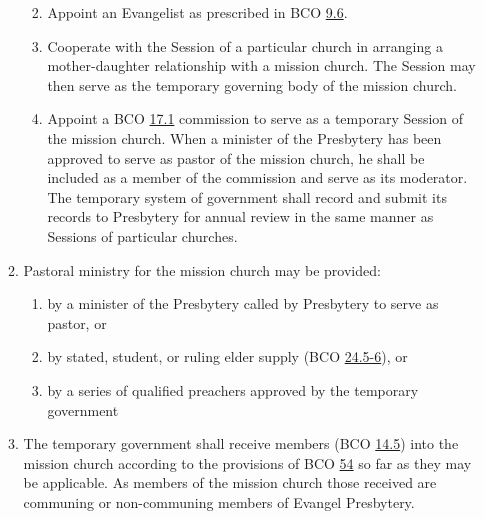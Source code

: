 \documentclass[
]{book}
\providecommand{\tightlist}{%
  \setlength{\itemsep}{0pt}\setlength{\parskip}{0pt}}
\begin{document}
\begin{enumerate}
\begin{enumerate}
    \begin{enumerate}
    \def\labelenumiii{\roman{enumiii}.}
    \tightlist
    \item
      Appoint an Evangelist as prescribed in BCO \protect\hyperlink{9.6}{9.6}.
    \item
      Cooperate with the Session of a particular church in arranging a mother-daughter relationship with a mission church. The Session may then serve as the temporary governing body of the mission church.
    \item
      Appoint a BCO \protect\hyperlink{17.1}{17.1} commission to serve as a temporary Session of the mission church. When a minister of the Presbytery has been approved to serve as pastor of the mission church, he shall be included as a member of the commission and serve as its moderator. The temporary system of government shall record and submit its records to Presbytery for annual review in the same manner as Sessions of particular churches.
    \end{enumerate}
  \item
    \protect\hypertarget{6.1.c}{\href{}{}}Pastoral ministry for the mission church may be provided:

    \begin{enumerate}
    \def\labelenumiii{\roman{enumiii}.}
    \tightlist
    \item
      by a minister of the Presbytery called by Presbytery to serve as pastor, or
    \item
      by stated, student, or ruling elder supply (BCO \protect\hyperlink{24.5}{24.5-6}), or
    \item
      by a series of qualified preachers approved by the temporary government
    \end{enumerate}
  \item
    \protect\hypertarget{6.1.d}{\href{}{}}The temporary government shall receive members (BCO \protect\hyperlink{14.5}{14.5}) into the mission church according to the provisions of BCO \protect\hyperlink{54}{54} so far as they may be applicable. As members of the mission church those received are communing or non-communing members of Evangel Presbytery.


\end{enumerate}
\end{enumerate}
\end{document}
